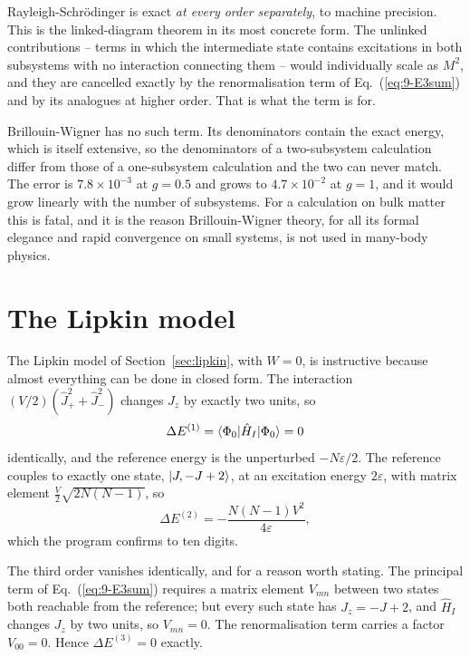 Rayleigh-Schr\"odinger is exact \emph{at every order separately}, to machine
precision.  This is the linked-diagram theorem in its most concrete form.
The unlinked contributions -- terms in which the intermediate state contains
excitations in both subsystems with no interaction connecting them -- would
individually scale as $M^2$, and they are cancelled exactly by the
renormalisation term of Eq.~(\ref{eq:9-E3sum}) and by its analogues at higher
order.  That is what the term is for.

Brillouin-Wigner has no such term.  Its denominators contain the exact energy,
which is itself extensive, so the denominators of a two-subsystem calculation
differ from those of a one-subsystem calculation and the two can never match.
The error is $7.8\times10^{-3}$ at $g=0.5$ and grows to $4.7\times10^{-2}$ at
$g=1$, and it would grow linearly with the number of subsystems.  For a
calculation on bulk matter this is fatal, and it is the reason
Brillouin-Wigner theory, for all its formal elegance and rapid convergence on
small systems, is not used in many-body physics.

\section{The Lipkin model}
\label{sec:mbptlipkin}

The Lipkin model of Section~\ref{sec:lipkin}, with $W=0$, is instructive
because almost everything can be done in closed form.  The interaction
$(V/2)(\hat{J}_+^2+\hat{J}_-^2)$ changes $J_z$ by exactly two units, so
\begin{equation}
  \Delta E^{(1)} = \langle \Phi_0 | \hat{H}_I | \Phi_0 \rangle = 0
  \label{eq:9-lipkinE1}
\end{equation}
identically, and the reference energy is the unperturbed $-N\varepsilon/2$.
The reference couples to exactly one state, $\vert J,-J+2 \rangle$, at an excitation
energy $2\varepsilon$, with matrix element
$\tfrac{V}{2}\sqrt{2N(N-1)}$, so
\begin{equation}
  \Delta E^{(2)} = -\frac{N(N-1)V^2}{4\varepsilon},
  \label{eq:9-lipkinE2}
\end{equation}
which the program confirms to ten digits.

The third order vanishes identically, and for a reason worth stating.  The
principal term of Eq.~(\ref{eq:9-E3sum}) requires a matrix element $V_{mn}$
between two states both reachable from the reference; but every such state
has $J_z=-J+2$, and $\hat{H}_I$ changes $J_z$ by two units, so $V_{mn}=0$.
The renormalisation term carries a factor $V_{00}=0$.  Hence
$\Delta E^{(3)}=0$ exactly.

